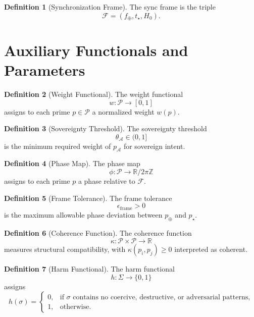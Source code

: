 \documentclass[12pt]{article}
\theoremstyle{definition}
\newtheorem{definition}{Definition}[section]
\theoremstyle{plain}
\begin{document}
\begin{definition}[Synchronization Frame]
The sync frame is the triple
\[
\mathcal{F} = (f_{\oplus}, t_{\star}, H_0).
\]
\end{definition}

\section{Auxiliary Functionals and Parameters}

\begin{definition}[Weight Functional]
The weight functional
\[
w : \mathcal{P} \to [0,1]
\]
assigns to each prime \(p \in \mathcal{P}\) a normalized weight \(w(p)\).
\end{definition}

\begin{definition}[Sovereignty Threshold]
The sovereignty threshold
\[
\theta_{\mathcal{A}} \in (0,1]
\]
is the minimum required weight of \(p_{\mathcal{A}}\) for sovereign intent.
\end{definition}

\begin{definition}[Phase Map]
The phase map
\[
\phi : \mathcal{P} \to \mathbb{R} / 2\pi\mathbb{Z}
\]
assigns to each prime \(p\) a phase relative to \(\mathcal{F}\).
\end{definition}

\begin{definition}[Frame Tolerance]
The frame tolerance
\[
\epsilon_{\mathrm{frame}} > 0
\]
is the maximum allowable phase deviation between \(p_{\oplus}\) and \(p_{\star}\).
\end{definition}

\begin{definition}[Coherence Function]
The coherence function
\[
\kappa : \mathcal{P} \times \mathcal{P} \to \mathbb{R}
\]
measures structural compatibility, with \(\kappa(p_i,p_j) \ge 0\) interpreted as coherent.
\end{definition}

\begin{definition}[Harm Functional]
The harm functional
\[
h : \Sigma \to \{0,1\}
\]
assigns
\[
h(\sigma) =
\begin{cases}
0, & \text{if } \sigma \text{ contains no coercive, destructive, or adversarial patterns},\\
1, & \text{otherwise}.
\end{cases}
\]
\end{definition}
\end{document}
